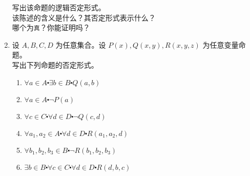 \begin{enumerate}[label=(\arabic*)]
        写出该命题的逻辑否定形式。\\
        该陈述的含义是什么？其否定形式表示什么？\\
        哪个为\verb|真|？你能证明吗？
    \item 设 $A,B,C,D$ 为任意集合。设 $P(x),Q(x, y),R(x, y, z)$ 为任意变量命题。\\
        写出下列命题的否定形式。
        \begin{enumerate}[label=(\alph*)]
            \item $\forall a \in A \centerdot \exists b \in B \centerdot Q(a, b)$
            \item $\forall a \in A \centerdot \neg P(a)$
            \item $\forall c \in C \centerdot \forall d \in D \centerdot \neg Q(c, d)$
            \item $\forall a_1, a_2 \in A \centerdot \forall d \in D \centerdot R(a_1, a_2, d)$
            \item $\forall b_1, b_2, b_3 \in B \centerdot \neg R(b_1, b_2, b_3)$
            \item $\exists b \in B \centerdot \forall c \in C \centerdot \forall d \in D \centerdot R(d, b, c)$
        \end{enumerate}
\end{enumerate}
